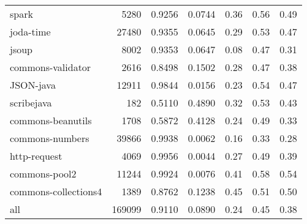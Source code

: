 \begin{table*}
\begin{tabular}{lrrrrrr}
                  spark &    5280 &          0.9256 &          0.0744 &         0.36 &         0.56 &             0.49 \\
              joda-time &   27480 &          0.9355 &          0.0645 &         0.29 &         0.53 &             0.47 \\
                  jsoup &    8002 &          0.9353 &          0.0647 &         0.08 &         0.47 &             0.31 \\
      commons-validator &    2616 &          0.8498 &          0.1502 &         0.28 &         0.47 &             0.38 \\
              JSON-java &   12911 &          0.9844 &          0.0156 &         0.23 &         0.54 &             0.47 \\
             scribejava &     182 &          0.5110 &          0.4890 &         0.32 &         0.53 &             0.43 \\
      commons-beanutils &    1708 &          0.5872 &          0.4128 &         0.24 &         0.49 &             0.33 \\
        commons-numbers &   39866 &          0.9938 &          0.0062 &         0.16 &         0.33 &             0.28 \\
           http-request &    4069 &          0.9956 &          0.0044 &         0.27 &         0.49 &             0.39 \\
          commons-pool2 &   11244 &          0.9924 &          0.0076 &         0.41 &         0.58 &             0.54 \\
   commons-collections4 &    1389 &          0.8762 &          0.1238 &         0.45 &         0.51 &             0.50 \\
                    all &  169099 &          0.9110 &          0.0890 &         0.24 &         0.45 &             0.38 \\
\bottomrule
\end{tabular}
\end{table*}
